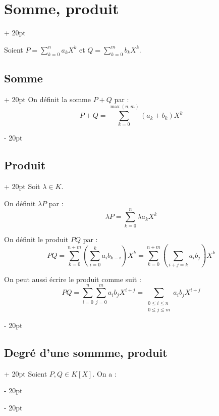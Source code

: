 \documentclass[a4paper, 12pt, twoside]{article}
\newcommand{\lr}[1]{\left( #1 \right)}
\renewcommand{\le}{\leqslant}
\newcommand{\ind}[1][20pt]{\advance\leftskip + #1}
\newcommand{\deind}[1][20pt]{\advance\leftskip - #1}
\newenvironment{indt}[2][20pt]{#2 \par \ind[#1]}{\par \deind} %
\begin{document}
    \begin{indt}{\section{Somme, produit}}
        
        Soient $\displaystyle P = \sum_{k = 0}^n a_k X^k$ et $\displaystyle Q = \sum_{k = 0}^m b_k X^k$.
        
        \begin{indt}{\subsection{Somme}}
            On définit la somme $P + Q$ par :
                \[ P + Q = \sum_{k = 0}^{\max(n, m)} (a_k + b_k)X^k \]
        \end{indt}
        
        
        \begin{indt}{\subsection{Produit}}
            Soit $\lambda \in K$.
            
            On définit $\lambda P$ par :
                \[\lambda P = \sum_{k = 0}^n \lambda a_k X^k  \]
            
            On définit le produit $PQ$ par :
                \[ PQ = \sum_{k = 0}^{n + m} \lr{\sum_{i = 0}^k a_i b_{k - i}} X^k = \sum_{k = 0}^{n + m} \lr{\sum_{i + j = k} a_i b_j} X^k \]
            
            On peut aussi écrire le produit comme suit :
                \[ PQ = \sum_{i = 0}^n \sum_{j = 0}^m a_i b_j X^{i + j} = \sum_{\substack{0 \le i \le n \\ 0 \le j \le m}} a_i b_j X^{i + j} \]
        \end{indt}
        
        \vspace{12pt}
        
        \begin{indt}{\subsection{Degré d'une sommme, produit}}
            Soient $P, Q \in K[X]$. On a :
            
            \vspace{6pt}
            

\end{indt}
\end{indt}
\end{document}
